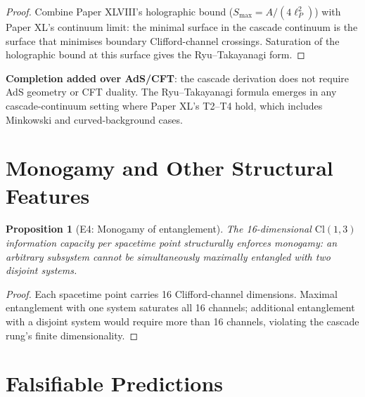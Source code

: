 \documentclass[12pt]{article}
\newtheorem{proposition}[theorem]{Proposition}
\theoremstyle{remark}
\begin{document}
\begin{proof}
Combine Paper XLVIII's holographic bound ($S_{\max} = A / (4\ell_P^2)$) with Paper XL's continuum limit: the minimal surface in the cascade continuum is the surface that minimises boundary Clifford-channel crossings. Saturation of the holographic bound at this surface gives the Ryu--Takayanagi form.
\end{proof}

\textbf{Completion added over AdS/CFT}: the cascade derivation does not require AdS geometry or CFT duality. The Ryu--Takayanagi formula emerges in any cascade-continuum setting where Paper XL's T2--T4 hold, which includes Minkowski and curved-background cases.

\section{Monogamy and Other Structural Features}\label{sec:monogamy}

\begin{proposition}[E4: Monogamy of entanglement]\label{prop:monogamy}
The 16-dimensional $\mathrm{Cl}(1,3)$ information capacity per spacetime point structurally enforces monogamy: an arbitrary subsystem cannot be simultaneously maximally entangled with two disjoint systems.
\end{proposition}

\begin{proof}
Each spacetime point carries 16 Clifford-channel dimensions. Maximal entanglement with one system saturates all 16 channels; additional entanglement with a disjoint system would require more than 16 channels, violating the cascade rung's finite dimensionality.
\end{proof}

\section{Falsifiable Predictions}\label{sec:predictions}
\end{document}
